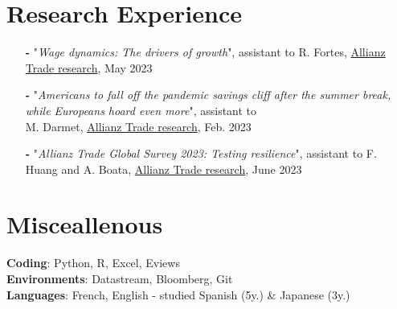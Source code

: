 \documentclass[letterpaper,10pt]{article}
\makeatletter
\newcommand{\up}[1]{\textsuperscript{#1}}
\newcommand{\resumeItem}[1]{
    \item\small{
            {#1 \vspace{-2pt}}
    }
}
\newcommand{\resumeSubheading}[4]{
    \vspace{-2pt}\item
    \begin{tabular*}{0.97\textwidth}[t]{l@{\extracolsep{\fill}}r}
        \textbf{#1}       & #2                 \\
        \textit{\small#3} & \textit{\small #4} \\
    \end{tabular*}\vspace{-7pt}
}
\newcommand{\resumeSubHeadingListStart}{\begin{itemize}[leftmargin=0.15in, label={}]}
\newcommand{\resumeSubHeadingListEnd}{\end{itemize}}
\newcommand{\resumeItemListStart}{\begin{itemize}}
\newcommand{\resumeItemListEnd}{\end{itemize}\vspace{-5pt}}
\makeatother
\begin{document}
\section{Research Experience}
\begin{itemize}
    \item[\textbf{-}] \small{"\textit{Wage dynamics: The drivers of growth}", assistant to R. Fortes, \textcolor{blue(pigment)}{\href{https://www.allianz.com/content/dam/onemarketing/azcom/Allianz_com/economic-research/publications/specials/en/2023/may/2023-05-03-LaborMarkets.pdf}{Allianz Trade research}}, May 2023}
    \item[\textbf{-}] \small{"\textit{Americans to fall off the pandemic savings cliff after the summer break, while Europeans hoard even more}", assistant to \\M. Darmet, \textcolor{blue(pigment)}{\href{https://www.allianz-trade.com/content/dam/onemarketing/aztrade/allianz-trade_com/en_gl/erd/publications/pdf/2023_02_02_excess_savings.pdf}{Allianz Trade research}}, Feb. 2023}
    \item[\textbf{-}] \small{"\textit{Allianz Trade Global Survey 2023: Testing resilience}", assistant to F. Huang and A. Boata, \textcolor{blue(pigment)}{\href{https://www.allianz.com/content/dam/onemarketing/azcom/Allianz_com/economic-research/publications/specials/en/2023/june/2023_06_01_TRADE-SURVEY23_AZ.pdf}{Allianz Trade research}}, June 2023}
\end{itemize}

\section{Misceallenous}
\begin{itemize}[leftmargin=0.15in, label={}]
\small{\item{
\textbf{Coding}{: Python, R, Excel, Eviews} \\
\textbf{Environments}{: Datastream, Bloomberg, Git}\\
\textbf{Languages}{: French, English - studied Spanish (5y.) \& Japanese (3y.)} \\
}}
\end{itemize}
\end{document}
